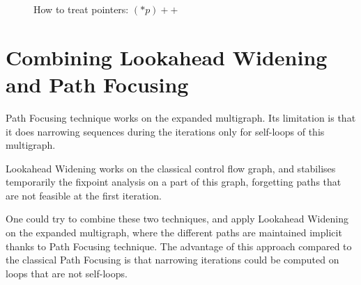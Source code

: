 \documentclass[a4paper,english,titlepage,11pt]{report}
\begin{document}
\begin{figure}[!h]
\centering
{}
\caption{How to treat pointers: $(*p)++$}
\label{pointers}
\end{figure}

	\section{Combining Lookahead Widening and Path Focusing}

	Path Focusing technique works on the expanded multigraph.
	Its limitation is that it does narrowing
	sequences during the iterations only for self-loops of this multigraph.
	
	Lookahead Widening works on the classical control flow graph, and stabilises
	temporarily the fixpoint analysis on a part of this graph, forgetting paths
	that are not feasible at the first iteration.

	One could try to combine these two techniques, and apply Lookahead Widening
	on the expanded multigraph, where the different paths are maintained
	implicit thanks to Path Focusing technique. The advantage of this approach
	compared to the classical Path Focusing is that narrowing iterations could
	be computed on loops that are not self-loops.
\end{document}

